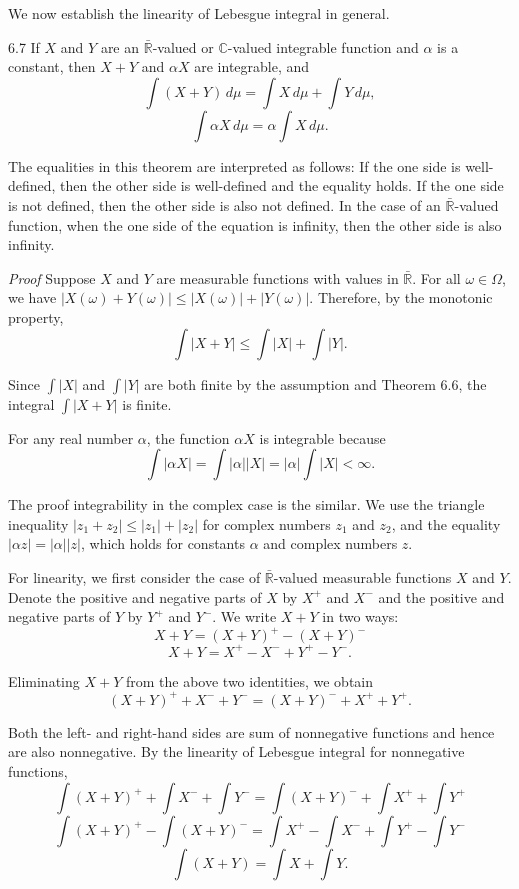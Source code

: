 We now establish the linearity of Lebesgue integral in general.

\begin{thmbox}{6.7}
If $X$ and $Y$ are an $\bar{\mathbb{R}}$-valued or $\mathbb{C}$-valued integrable function and $\alpha$ is a constant, then $X+Y$ and $\alpha X$ are integrable, and
\[
\int (X+Y)\, d\mu = \int X\, d\mu + \int Y\, d\mu,
\]
\[
\int \alpha X\, d\mu = \alpha \int X\, d\mu.
\]
\end{thmbox}

The equalities in this theorem are interpreted as follows: If the one side is well-defined, then the other side is well-defined and the equality holds. If the one side is not defined, then the other side is also not defined. In the case of an $\bar{\mathbb{R}}$-valued function, when the one side of the equation is infinity, then the other side is also infinity.

\textit{Proof} Suppose $X$ and $Y$ are measurable functions with values in $\bar{\mathbb{R}}$. For all $\omega \in \Omega$, we have $|X(\omega)+Y(\omega)|\le |X(\omega)|+|Y(\omega)|$. Therefore, by the monotonic property,
\[
\int |X+Y| \le \int |X|+\int |Y|.
\]

Since $\int |X|$ and $\int |Y|$ are both finite by the assumption and Theorem 6.6, the integral $\int |X+Y|$ is finite.

For any real number $\alpha$, the function $\alpha X$ is integrable because
\[
\int |\alpha X| = \int |\alpha||X| = |\alpha|\int |X| < \infty.
\]

The proof integrability in the complex case is the similar. We use the triangle inequality $|z_1+z_2|\le |z_1|+|z_2|$ for complex numbers $z_1$ and $z_2$, and the equality $|\alpha z|=|\alpha||z|$, which holds for constants $\alpha$ and complex numbers $z$.

For linearity, we first consider the case of $\bar{\mathbb{R}}$-valued measurable functions $X$ and $Y$. Denote the positive and negative parts of $X$ by $X^+$ and $X^-$ and the positive and negative parts of $Y$ by $Y^+$ and $Y^-$. We write $X+Y$ in two ways:
\[
X+Y=(X+Y)^+-(X+Y)^-
\]
\[
X+Y=X^+-X^-+Y^+-Y^-.
\]

Eliminating $X+Y$ from the above two identities, we obtain
\[
(X+Y)^+ + X^- + Y^- = (X+Y)^- + X^+ + Y^+.
\]

Both the left- and right-hand sides are sum of nonnegative functions and hence are also nonnegative. By the linearity of Lebesgue integral for nonnegative functions,
\[
\int (X+Y)^+ + \int X^- + \int Y^- = \int (X+Y)^- + \int X^+ + \int Y^+
\]
\[
\int (X+Y)^+ - \int (X+Y)^- = \int X^+ - \int X^- + \int Y^+ - \int Y^-
\]
\[
\int (X+Y) = \int X+\int Y.
\]

